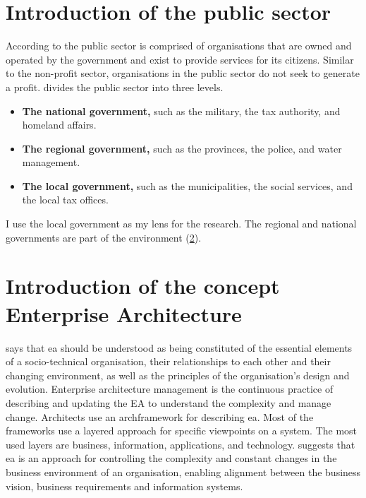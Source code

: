\section{Introduction of the public sector}
\label{sec:intropublicsector}
According to \textcite{PrivacySense2016} the public sector is comprised of organisations that are owned and operated by the government and exist to provide services for its citizens. Similar to the non-profit sector, organisations in the public sector do not seek to generate a profit. \textcite{PrivacySense2016} divides the public sector into three levels.

\begin{itemize}
	\item{\textbf{The national government,} such as the military, the tax authority, and homeland affairs.}
	\item{\textbf{The regional government,} such as the provinces, the police, and water management.}
	\item{\textbf{The local government,} such as the municipalities, the social services, and the local tax offices.}
\end{itemize}
I use the local government as my lens for the research. The regional and national governments are part of the environment (\cref{sec:introea}).

\section{Introduction of the concept Enterprise Architecture}
\label{sec:introea}

\textcite[p. 104]{Lapalme2016} says that \acrshort{ea} should be understood as being constituted of the essential elements of a socio-technical organisation, their relationships to each other and their changing environment, as well as the principles of the organisation’s design and evolution. Enterprise architecture management is the continuous practice of describing and updating the EA to understand the complexity and manage change. Architects use an \gls{archframework} for describing \acrshort{ea}. Most of the frameworks use a layered approach for specific viewpoints on a system. The most used layers are business, information, applications, and technology. \textcite[p. 189]{Ylimaeki2005} suggests that \acrshort{ea} is an approach for controlling the complexity and constant changes in the business environment of an organisation, enabling alignment between the business vision, business requirements and information systems.

